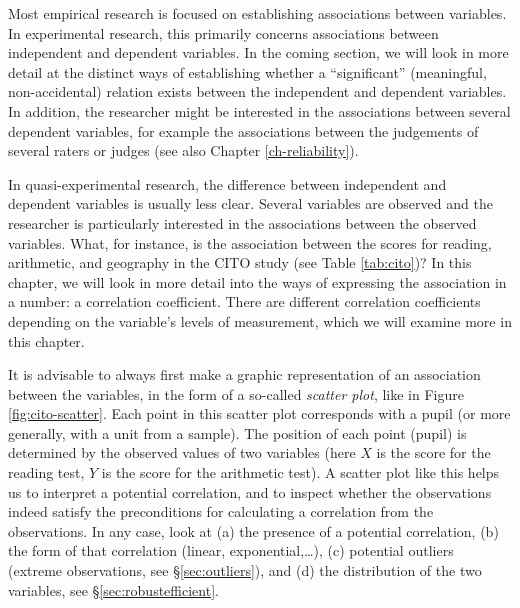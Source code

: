 \documentclass[
]{book}
\begin{document}
Most empirical research is focused on establishing associations between
variables. In experimental research, this primarily concerns associations
between independent and dependent variables. In the coming section, we will
look in more detail at the distinct ways of establishing whether a ``significant''
(meaningful, non-accidental) relation exists between
the independent and dependent variables. In addition, the researcher might be
interested in the associations between several dependent variables,
for example the associations between the judgements of several
raters or judges (see also Chapter \ref{ch-reliability}).

In quasi-experimental research, the difference between
independent and dependent variables is usually less clear. Several
variables are observed and the researcher is particularly interested
in the associations between the observed
variables. What, for instance, is the association between the scores for reading,
arithmetic, and geography in the CITO study (see
Table \ref{tab:cito})? In this chapter, we will look in more detail
into the ways of expressing the association in a number:
a correlation coefficient. There are different correlation coefficients depending on
the variable's levels of measurement, which we will
examine more in this chapter.

It is advisable to always first make a graphic representation of
an association between the variables, in the form of a so-called
\emph{scatter plot},
like in Figure \ref{fig:cito-scatter}. Each point in this scatter plot
corresponds with a pupil (or more generally, with a unit from a
sample). The position of each point (pupil) is determined by the observed
values of two variables (here \(X\) is the score for the reading test,
\(Y\) is the score for the arithmetic test). A scatter plot like this helps us to
interpret a potential correlation, and to inspect whether the observations
indeed satisfy the preconditions for calculating a correlation from the
observations. In any case, look at (a) the presence of a potential correlation,
(b) the form of that correlation (linear, exponential,\ldots),
(c) potential outliers (extreme observations, see §\ref{sec:outliers}),
and (d) the distribution of the two variables,
see §\ref{sec:robustefficient}.
\end{document}
